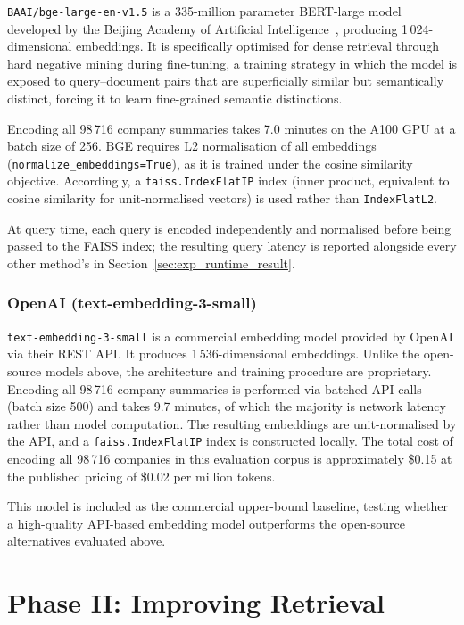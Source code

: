 \documentclass[a4paper,oneside,bibliography=totoc]{scrbook}
\begin{document}
\begin{sloppypar}
\texttt{BAAI/bge-large-en-v1.5} is a 335-million parameter BERT-large model developed by the Beijing Academy of Artificial Intelligence~\citep{xiao2024cpack}, producing 1\,024-dimensional embeddings. It is specifically optimised for dense retrieval through hard negative mining during fine-tuning, a training strategy in which the model is exposed to query--document pairs that are superficially similar but semantically distinct, forcing it to learn fine-grained semantic distinctions.
\end{sloppypar}

Encoding all 98\,716 company summaries takes 7.0 minutes on the A100 GPU at a batch size of 256. BGE requires L2 normalisation of all embeddings (\texttt{normalize\_embeddings=True}), as it is trained under the cosine similarity objective. Accordingly, a \texttt{faiss.IndexFlatIP} index (inner product, equivalent to cosine similarity for unit-normalised vectors) is used rather than \texttt{IndexFlatL2}.

At query time, each query is encoded independently and normalised before being passed to the FAISS index; the resulting query latency is reported alongside every other method's in Section~\ref{sec:exp_runtime_result}.

\subsubsection{OpenAI (text-embedding-3-small)}
\label{subsec:openai}

\texttt{text-embedding-3-small} is a commercial embedding model provided by OpenAI via their REST API. It produces 1\,536-dimensional embeddings. Unlike the open-source models above, the architecture and training procedure are proprietary. Encoding all 98\,716 company summaries is performed via batched API calls (batch size 500) and takes 9.7 minutes, of which the majority is network latency rather than model computation. The resulting embeddings are unit-normalised by the API, and a \texttt{faiss.IndexFlatIP} index is constructed locally. The total cost of encoding all 98\,716 companies in this evaluation corpus is approximately \$0.15 at the published pricing of \$0.02 per million tokens.

This model is included as the commercial upper-bound baseline, testing whether a high-quality API-based embedding model outperforms the open-source alternatives evaluated above.

\section{Phase II: Improving Retrieval}
\label{sec:phase2_method}
\end{document}
